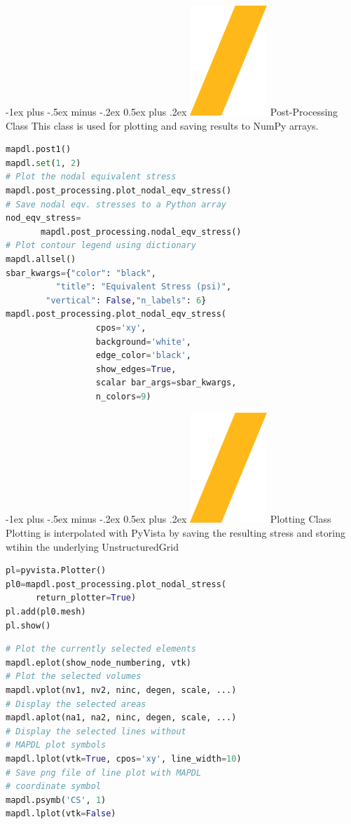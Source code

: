 \documentclass[9pt,landscape]{article}
\makeatletter
\renewcommand{\section}{\@startsection{section}{1}{0mm}%
                                {-1ex plus -.5ex minus -.2ex}%
                                {0.5ex plus .2ex}%
                                {\normalfont\large\bfseries}}
\def\code#1{\textit{}{#1}}
\makeatother
\begin{document}
\begin{multicols}{3}
\columnbreak

\section{\includegraphics[height=\fontcharht\font`\S]{slash.png} Post-Processing Class}
This class is used for plotting and saving results to NumPy arrays.
\begin{lstlisting}[language=Python]
mapdl.post1()
mapdl.set(1, 2)
# Plot the nodal equivalent stress
mapdl.post_processing.plot_nodal_eqv_stress()
# Save nodal eqv. stresses to a Python array
nod_eqv_stress=
       mapdl.post_processing.nodal_eqv_stress()
# Plot contour legend using dictionary
mapdl.allsel()
sbar_kwargs={"color": "black",
          "title": "Equivalent Stress (psi)",
        "vertical": False,"n_labels": 6}
mapdl.post_processing.plot_nodal_eqv_stress(
                  cpos='xy',
                  background='white',
                  edge_color='black',
                  show_edges=True,
                  scalar bar_args=sbar_kwargs,
                  n_colors=9)
\end{lstlisting} 
\vfill
\section{\includegraphics[height=\fontcharht\font`\S]{slash.png} Plotting Class}
Plotting is interpolated with PyVista by saving the resulting stress and storing wtihin the underlying UnstructuredGrid
\begin{lstlisting}[language=Python]
pl=pyvista.Plotter()
pl0=mapdl.post_processing.plot_nodal_stress(
      return_plotter=True)
pl.add(pl0.mesh)
pl.show()
\end{lstlisting} 
\begin{lstlisting}[language=Python]
# Plot the currently selected elements
mapdl.eplot(show_node_numbering, vtk)
# Plot the selected volumes
mapdl.vplot(nv1, nv2, ninc, degen, scale, ...)
# Display the selected areas
mapdl.aplot(na1, na2, ninc, degen, scale, ...)
# Display the selected lines without 
# MAPDL plot symbols
mapdl.lplot(vtk=True, cpos='xy', line_width=10)
# Save png file of line plot with MAPDL 
# coordinate symbol
mapdl.psymb('CS', 1)
mapdl.lplot(vtk=False)
\end{lstlisting} 
\vfill


\end{multicols}
\end{document}
